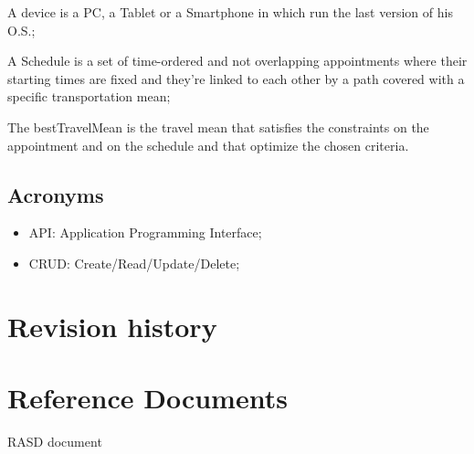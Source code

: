 \begin{definition} \label{def:device}
A device is a PC, a Tablet or a Smartphone in which run the last version of his O.S.;
\end{definition}

\begin{definition} \label{def:schedule}
A Schedule is a set of time-ordered and not overlapping appointments where their starting times are fixed and they're linked to each other by a path covered with a specific transportation mean;
\end{definition}

\begin{definition} \label{def:bestTravelMean}
The bestTravelMean is the travel mean that satisfies the constraints on the appointment and on the schedule and that optimize the chosen criteria.
\end{definition}


\subsection{Acronyms}
\begin{itemize}
\item API: Application Programming Interface;
\item CRUD: Create/Read/Update/Delete;
\end{itemize}


\section{Revision history}

\section{Reference Documents}
RASD document

